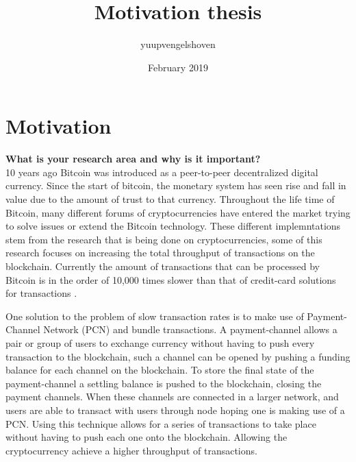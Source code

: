 \documentclass{article}
\title{Motivation thesis}
\author{yuupvengelshoven }
\date{February 2019}
\newcounter{mn}
\newcommand{\superscript}[1]{\ensuremath{{}^{\textrm{\scriptsize #1}}}}
\newcommand{\mntext}[1]{\colorbox{pink}{\begin{color}{black}#1\end{color}}}
\newcommand{\mn}[2][]{{\tiny\superscript{\mntext{\arabic{mn}}}}\marginpar{\scriptsize{
  \ifthenelse{\isempty{#1}}
  {\mntext{\parbox{0.95\marginparwidth}{\superscript{\arabic{mn}} \raggedright{#2}}}}
  {\mntext{\parbox{0.95\marginparwidth}{\superscript{\arabic{mn}}#1 says: \raggedright{#2}}}}
}}\stepcounter{mn}}
\begin{document}
\maketitle 



\section{Motivation}


\textbf{What is your research area and why is it important?} \\


10 years ago Bitcoin was introduced as a peer-to-peer decentralized digital currency\cite{nakamoto2008bitcoin}. Since the start of bitcoin, the monetary system has seen rise and fall in value due to the amount of trust to that currency. Throughout the life time of Bitcoin, many different forums of cryptocurrencies have entered the market trying to solve issues or extend the Bitcoin technology\cite{wood2014ethereum, buterin2014next}. These different implemntations stem from the research that is being done on cryptocurrencies, some of this research focuses on increasing the total throughput of transactions on the blockchain. Currently the amount of transactions that can be processed by Bitcoin is in the order of 10,000 times slower than that of credit-card solutions for transactions \cite{trillo2013stress}. 


One solution to the problem of slow transaction rates is to make use of Payment-Channel Network (PCN) and bundle transactions\cite{poon2016bitcoin}. A payment-channel allows a pair or group of users to exchange currency without having to push every transaction to the blockchain, such a channel can be opened by pushing a funding balance for each channel on the blockchain. To store the final state of the payment-channel a settling balance is pushed to the blockchain, closing the payment channels. When these channels are connected in a larger network, and users are able to transact with users through node hoping one is making use of a PCN. Using this technique allows for a series of transactions to take place without having to push each one onto the blockchain. Allowing the cryptocurrency achieve a higher throughput of transactions. 
\end{document}
